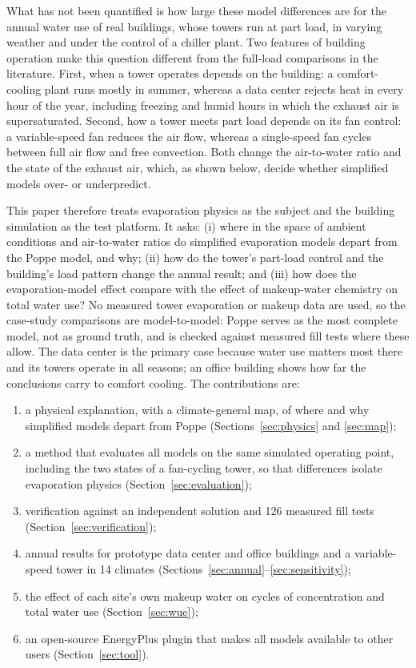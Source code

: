 \documentclass[preprint,12pt]{elsarticle}
\begin{document}
What has not been quantified is how large these model differences are for the annual water use of real buildings,
whose towers run at part load, in varying weather and under the control of a chiller plant. Two features of building
operation make this question different from the full-load comparisons in the literature. First, when a tower operates
depends on the building: a comfort-cooling plant runs mostly in summer, whereas a data center rejects heat in every hour
of the year, including freezing and humid hours in which the exhaust air is supersaturated. Second, how a tower meets
part load depends on its fan control: a variable-speed fan reduces the air flow, whereas a single-speed fan cycles
between full air flow and free convection. Both change the air-to-water ratio and the state of the exhaust air, which,
as shown below, decide whether simplified models over- or underpredict.

This paper therefore treats evaporation physics as the subject and the building simulation as the test platform. It
asks: (i) where in the space of ambient conditions and air-to-water ratios do simplified evaporation models depart from
the Poppe model, and why; (ii) how do the tower's part-load control and the building's load pattern change the annual
result; and (iii) how does the evaporation-model effect compare with the effect of makeup-water chemistry on total
water use? No measured tower evaporation or makeup data are used, so the case-study comparisons are model-to-model:
Poppe serves as the most complete model, not as ground truth, and is checked against measured fill tests where these
allow. The data center is the primary case because water use matters most there and its towers operate in all seasons;
an office building shows how far the conclusions carry to comfort cooling. The contributions are:
\begin{enumerate}
\item a physical explanation, with a climate-general map, of where and why simplified models depart from Poppe
(Sections~\ref{sec:physics} and \ref{sec:map});
\item a method that evaluates all models on the same simulated operating point, including the two states of a
fan-cycling tower, so that differences isolate evaporation physics (Section~\ref{sec:evaluation});
\item verification against an independent solution and 126 measured fill tests (Section~\ref{sec:verification});
\item annual results for prototype data center and office buildings and a variable-speed tower in 14 climates
(Sections~\ref{sec:annual}--\ref{sec:sensitivity});
\item the effect of each site's own makeup water on cycles of concentration and total water use (Section~\ref{sec:wue});
\item an open-source EnergyPlus plugin that makes all models available to other users (Section~\ref{sec:tool}).
\end{enumerate}
\end{document}
